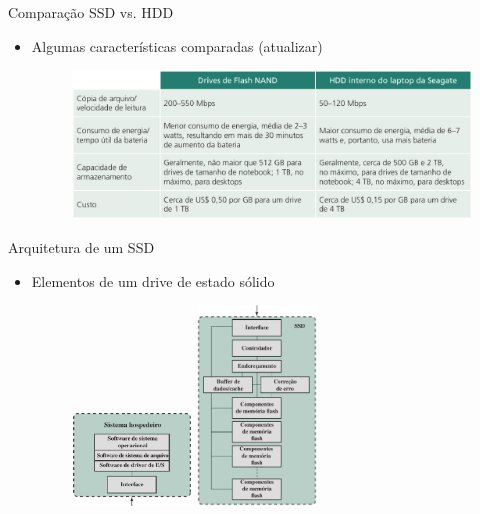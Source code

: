 \begin{slide}{Comparação SSD vs. HDD}
	\begin{itemize}
		\item Algumas características comparadas (atualizar)
			\begin{figure}
				\includegraphics[width=\textwidth]{figs/tab6-5}
			\end{figure}
	\end{itemize}
\end{slide}
\begin{slide}{Arquitetura de um SSD}
	\begin{itemize}
		\item Elementos de um drive de estado sólido
			\begin{figure}
				\includegraphics[width=0.30\textwidth]{figs/ssd1}
				\includegraphics[width=0.30\textwidth]{figs/ssd2}
			\end{figure}
	\end{itemize}
\end{slide}

